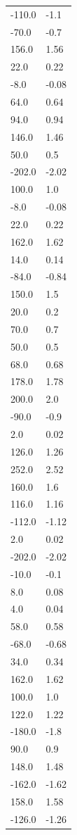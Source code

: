 \begin{longtable}{ll}
-110.0 & -1.1 \\
-70.0 & -0.7 \\
156.0 & 1.56 \\
22.0 & 0.22 \\
-8.0 & -0.08 \\
64.0 & 0.64 \\
94.0 & 0.94 \\
146.0 & 1.46 \\
50.0 & 0.5 \\
-202.0 & -2.02 \\
100.0 & 1.0 \\
-8.0 & -0.08 \\
22.0 & 0.22 \\
162.0 & 1.62 \\
14.0 & 0.14 \\
-84.0 & -0.84 \\
150.0 & 1.5 \\
20.0 & 0.2 \\
70.0 & 0.7 \\
50.0 & 0.5 \\
68.0 & 0.68 \\
178.0 & 1.78 \\
200.0 & 2.0 \\
-90.0 & -0.9 \\
2.0 & 0.02 \\
126.0 & 1.26 \\
252.0 & 2.52 \\
160.0 & 1.6 \\
116.0 & 1.16 \\
-112.0 & -1.12 \\
2.0 & 0.02 \\
-202.0 & -2.02 \\
-10.0 & -0.1 \\
8.0 & 0.08 \\
4.0 & 0.04 \\
58.0 & 0.58 \\
-68.0 & -0.68 \\
34.0 & 0.34 \\
162.0 & 1.62 \\
100.0 & 1.0 \\
122.0 & 1.22 \\
-180.0 & -1.8 \\
90.0 & 0.9 \\
148.0 & 1.48 \\
-162.0 & -1.62 \\
158.0 & 1.58 \\
-126.0 & -1.26 \\

\end{longtable}
